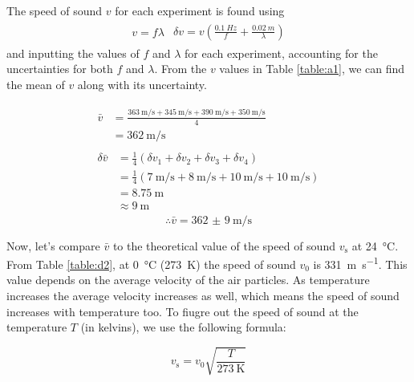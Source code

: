 \documentclass[letter]{article}
\numberwithin{equation}{section}
\numberwithin{figure}{section}
\numberwithin{table}{section}
\begin{document}
The speed of sound \(v\) for each experiment is found using
\begin{align} \label{eq:a4}
  \begin{split}
    v = f \lambda
  \end{split}
  \begin{split}
    \delta v = v \left(\frac{\SI{0.1}{Hz}}{f} + \frac{\SI{0.02}{m}}{\lambda} \right)
  \end{split}
\end{align}
and inputting the values of \(f\) and \(\lambda\) for each experiment, accounting for the uncertainties for both \(f\) and \(\lambda\). From the \(v\) values in Table \ref{table:a1}, we can find the mean of \(v\) along with its uncertainty.

\begin{align*}
  \begin{split}
    \bar{v} &= \frac{\SI{363}{\metre\per\second} + \SI{345}{\metre\per\second} + \SI{390}{\metre\per\second} + \SI{350}{\metre\per\second}}{4} \\
    &= \SI{362}{\metre\per\second}
  \end{split} \\
  \begin{split}
    \delta \bar{v} &= \frac{1}{4} (\delta v_1 + \delta v_2 + \delta v_3 + \delta v_4) \\
    &= \frac{1}{4} (\SI{7}{\metre\per\second} + \SI{8}{\metre\per\second} + \SI{10}{\metre\per\second} + \SI{10}{\metre\per\second}) \\
    &= \SI{8.75}{\metre} \\
    &\approx \SI{9}{\metre}
  \end{split}
\end{align*}
\[\therefore \bar{v} = \SI{362(9)}{\metre\per\second}\]

Now, let's compare \(\bar{v}\) to the theoretical value of the speed of sound \(v_{\mathrm{s}}\) at \SI{24}{\celsius}. From Table \ref{table:d2}, at \SI{0}{\celsius} (\SI{273}{\kelvin}) the speed of sound \(v_0\) is \SI{331}{\metre\per\second}. This value depends on the average velocity of the air particles. As temperature increases the average velocity increases as well, which means the speed of sound increases with temperature too. To fiugre out the speed of sound at the temperature \(T\) (in kelvins), we use the following formula:

\begin{equation} \label{eq:a5}
  v_{\mathrm{s}} = v_0 \sqrt{\frac{T}{\SI{273}{\kelvin}}}
\end{equation}
\end{document}
